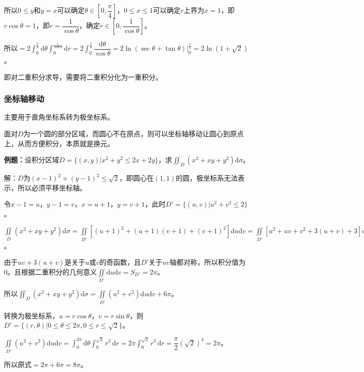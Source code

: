 所以$0\leqslant y$和$y=x$可以确定$\theta\in\left[0,\dfrac{\pi}{4}\right]$，$0\leqslant x\leqslant1$可以确定$r$上界为$x=1$，即$r\cos\theta=1$，即$r=\dfrac{1}{\cos\theta}$，确定$r\in\left[0,\dfrac{1}{\cos\theta}\right]$。

所以$=2\int_0^{\frac{\pi}{4}}\textrm{d}\theta\int_0^{\frac{1}{\cos\theta}}\textrm{d}r=2\int_0^{\frac{\pi}{4}}\dfrac{\textrm{d}\theta}{\cos\theta}=2\ln(\sec\theta+\tan\theta)|_0^{\frac{\pi}{4}}=2\ln(1+\sqrt{2})$。

即对二重积分求导，需要将二重积分化为一重积分。

\subsubsection{坐标轴移动}

主要用于直角坐标系转为极坐标系。

面对$D$为一个圆的部分区域，而圆心不在原点，则可以坐标轴移动让圆心到原点上，从而方便积分，本质就是换元。

\textbf{例题：}设积分区域$D=\{(x,y)\vert x^2+y^2\leqslant2x+2y\}$，求$\iint_D(x^2+xy+y^2)\textrm{d}\sigma$。

解：$D$为$(x-1)^2+(y-1)^2\leqslant\sqrt{2}$，即圆心在$(1,1)$的圆，极坐标系无法表示，所以必须平移坐标轴。

令$x-1=u$，$y-1=v$，$x=u+1$，$y=v+1$，此时$D'=\{(u,v)|u^2+v^2\leqslant2\}$。

$\iint\limits_D(x^2+xy+y^2)\textrm{d}\sigma=\iint\limits_{D'}[(u+1)^2+(u+1)(v+1)+(v+1)^2]\textrm{d}u\textrm{d}v=\iint\limits_{D'}[u^2+uv+v^2+3(u+v)+3]\textrm{d}u\textrm{d}v=\iint\limits_{D'}(u^2+v^2)\textrm{d}u\textrm{d}v+\iint\limits_{D'}[uv+3(u+v)]\textrm{d}u\textrm{d}v+3\iint_{D'}\textrm{d}u\textrm{d}v$。

由于$uv+3(u+v)$是关于$u$或$v$的奇函数，且$D'$关于$uv$轴都对称，所以积分值为0。且根据二重积分的几何意义$\iint\limits_{D'}\textrm{d}u\textrm{d}v=S_{D'}=2\pi$。

所以$\iint_D(x^2+xy+y^2)\textrm{d}\sigma=\iint\limits_{D'}(u^2+v^2)\textrm{d}u\textrm{d}v+6\pi$。

转换为极坐标系，$u=r\cos\theta$，$v=r\sin\theta$，则$D'=\{(r,\theta)|0\leqslant\theta\leqslant2\pi,0\leqslant r\leqslant\sqrt{2}\}$。

$\iint\limits_{D'}(u^2+v^2)\textrm{d}u\textrm{d}v=\int_0^{2\pi}\textrm{d}\theta\int_0^{\sqrt{2}}r^3\,\textrm{d}r=2\pi\int_0^{\sqrt{2}}r^3\,\textrm{d}r=\dfrac{\pi}{2}(\sqrt{2})^4=2\pi$。

所以原式$=2\pi+6\pi=8\pi$。

